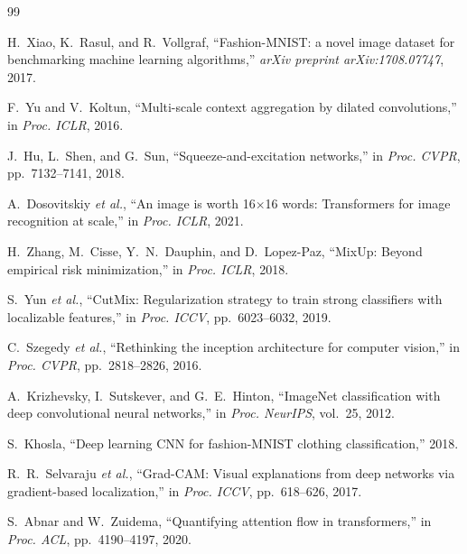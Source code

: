 \documentclass[10pt,a4paper]{article}
\begin{document}
\newpage

\begin{thebibliography}{99}

H.~Xiao, K.~Rasul, and R.~Vollgraf,
``Fashion-MNIST: a novel image dataset for benchmarking machine learning algorithms,''
\textit{arXiv preprint arXiv:1708.07747}, 2017.

F.~Yu and V.~Koltun,
``Multi-scale context aggregation by dilated convolutions,''
in \textit{Proc. ICLR}, 2016.

J.~Hu, L.~Shen, and G.~Sun,
``Squeeze-and-excitation networks,''
in \textit{Proc. CVPR}, pp.~7132--7141, 2018.

A.~Dosovitskiy \textit{et al.},
``An image is worth 16$\times$16 words: Transformers for image recognition at scale,''
in \textit{Proc. ICLR}, 2021.

H.~Zhang, M.~Cisse, Y.~N.~Dauphin, and D.~Lopez-Paz,
``MixUp: Beyond empirical risk minimization,''
in \textit{Proc. ICLR}, 2018.

S.~Yun \textit{et al.},
``CutMix: Regularization strategy to train strong classifiers with localizable features,''
in \textit{Proc. ICCV}, pp.~6023--6032, 2019.

C.~Szegedy \textit{et al.},
``Rethinking the inception architecture for computer vision,''
in \textit{Proc. CVPR}, pp.~2818--2826, 2016.

A.~Krizhevsky, I.~Sutskever, and G.~E.~Hinton,
``ImageNet classification with deep convolutional neural networks,''
in \textit{Proc. NeurIPS}, vol.~25, 2012.

S.~Khosla,
``Deep learning CNN for fashion-MNIST clothing classification,'' 2018.

R.~R.~Selvaraju \textit{et al.},
``Grad-CAM: Visual explanations from deep networks via gradient-based localization,''
in \textit{Proc. ICCV}, pp.~618--626, 2017.

S.~Abnar and W.~Zuidema,
``Quantifying attention flow in transformers,''
in \textit{Proc. ACL}, pp.~4190--4197, 2020.

\end{thebibliography}
\end{document}
